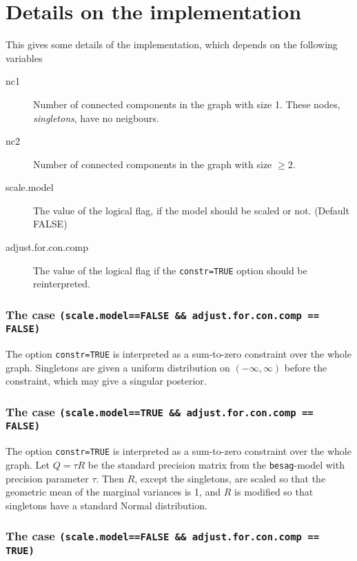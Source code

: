 
\section*{Details on the implementation}

This gives some details of the implementation, which depends on the
following variables
\begin{description}
\item[nc1] Number of connected components in the graph with size 1.
    These nodes, \emph{singletons}, have no neigbours.
\item[nc2] Number of connected components in the graph with size
    $\ge2$.
\item[scale.model] The value of the logical flag, if the model should
    be scaled or not. (Default FALSE)
\item[adjust.for.con.comp] The value of the logical flag if the
    \texttt{constr=TRUE} option should be reinterpreted.
\end{description}

\subsubsection*{The case \texttt{(scale.model==FALSE \&\&
        adjust.for.con.comp == FALSE)}}

The option \texttt{constr=TRUE} is interpreted as a sum-to-zero
constraint over the whole graph. Singletons are given a uniform
distribution on $(-\infty,\infty)$ before the constraint, which may
give a singular posterior.

\subsubsection*{The case \texttt{(scale.model==TRUE \&\&
        adjust.for.con.comp == FALSE)}}

The option \texttt{constr=TRUE} is interpreted as a sum-to-zero
constraint over the whole graph. Let $Q = \tau R$ be the standard
precision matrix from the \texttt{besag}-model with precision
parameter $\tau$. Then $R$, except the singletons, are scaled so that
the geometric mean of the marginal variances is 1, and $R$ is modified
so that singletons have a standard Normal distribution.

\subsubsection*{The case \texttt{(scale.model==FALSE \&\&
        adjust.for.con.comp == TRUE)}}


